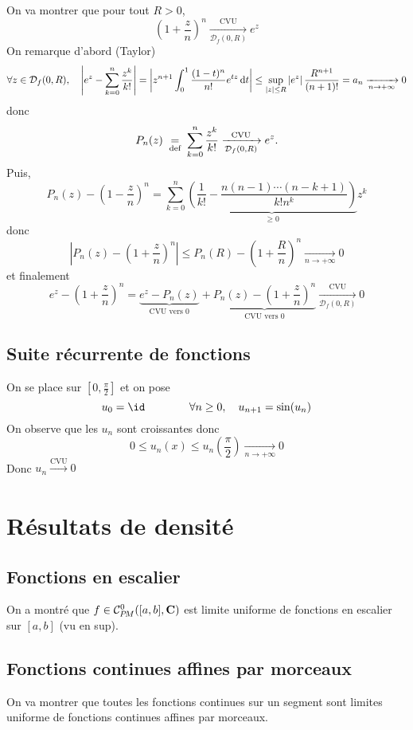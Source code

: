 On va montrer que pour tout $R>0$,  \[
    \left( 1+\frac{z}{n} \right) ^n \xrightarrow[\displaystyle\mathcal  D_f(0, R)]{\text{CVU}}e^z
\] 
On remarque d'abord (Taylor) \[
    \forall  z \in  \mathcal  D_f(0, R), \quad  \left| e^z- \sum_{k=0}^{n} \frac{z^k}{k!} \right| = \left| z^{n+1}\int_0^1 \frac{(1-t)^n}{n!}e^{tz}\mathop{}\!\mathrm d t \right| \leq \sup_{|z|\leq R} \left|e^z\right| \frac{R^{n+1}}{(n+1)!}=a_n \xrightarrow[n\to+\infty]{}0
\] 
donc \[
    P_n(z)\;\underset{\text{def}}=\; \sum_{k=0}^{n} \frac{z^k}{k!} \xrightarrow[\mathcal  D_f(0, R)]{\text{CVU}} e^z.
\]
Puis, \[
    P_n(z)-\left( 1-\frac{z}{n} \right) ^n= \sum_{k=0}^{n} \underbrace{\left( \frac{1}{k!}-\frac{n(n-1)\cdots (n-k+1)}{k!n^k} \right) }_{\geq 0}z^k
\] 
donc \[
    \left| P_n(z)- \left( 1+\frac{z}{n} \right) ^n \right| \leq P_n(R)- \left( 1+\frac{R}{n} \right) ^n \xrightarrow[n\to+\infty]{}0
\] 
et finalement \[
    e^z-\left( 1+\frac{z}{n} \right) ^n= \underbrace{e^z-P_n(z)}_{\text{CVU vers } 0}+\underbrace{P_n(z)-\left( 1+\frac{z}{n} \right) ^n}_{\text{CVU vers }0} \xrightarrow[\mathcal D_f(0, R)]{\text{CVU}}0
\] 

\subsection{Suite récurrente de fonctions}

On se place sur $[0, \frac{\pi}{2}]$ et on pose \[
    u_0=\id \qquad  \qquad  \forall  n\geq 0, \quad  u_{n+1}=\sin(u_n)
\] 
On observe que les $u_n$ sont croissantes donc  \[
    0\leq u_n(x)\leq u_n\left( \frac{\pi }{2} \right) \xrightarrow[n\to+\infty]{}0
\] 
Donc $u_n \xrightarrow[]{\text{CVU}}0$ 

\section{Résultats de densité}

\subsection{Fonctions en escalier}

On a montré que $f \in  \CPM([a, b], \C)$ est limite uniforme de fonctions en escalier sur $[a, b]$ (vu en sup).

\subsection{Fonctions continues affines par morceaux}

On va montrer que toutes les fonctions continues sur un segment sont limites uniforme de fonctions continues affines par morceaux.

